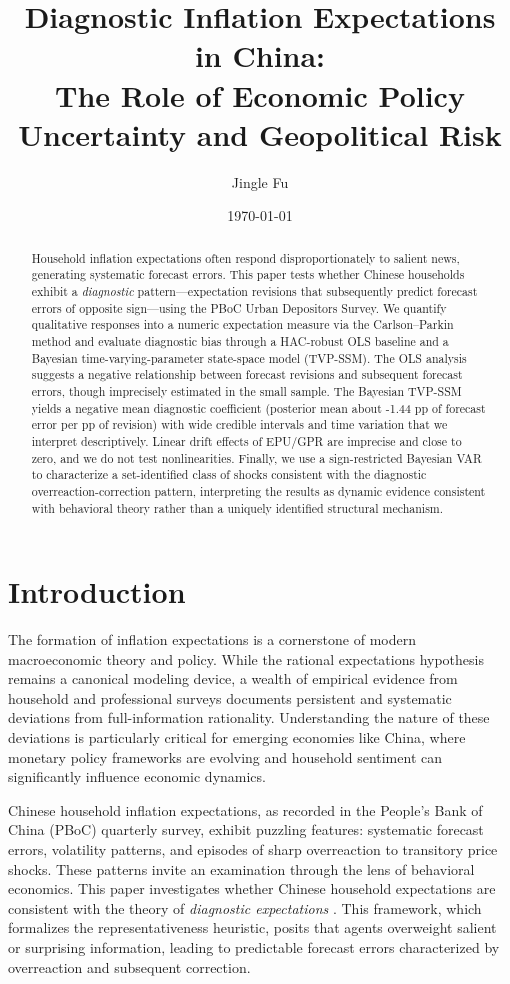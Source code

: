 \documentclass[12pt]{article}
\title{Diagnostic Inflation Expectations in China:\\ The Role of Economic Policy Uncertainty and Geopolitical Risk}
\author{Jingle Fu}
\date{\today}
\begin{document}
\maketitle

\begin{abstract}
    Household inflation expectations often respond disproportionately to salient news, generating systematic forecast errors. This paper tests whether Chinese households exhibit a \emph{diagnostic} pattern—expectation revisions that subsequently predict forecast errors of opposite sign—using the PBoC Urban Depositors Survey. We quantify qualitative responses into a numeric expectation measure via the Carlson–Parkin method and evaluate diagnostic bias through a HAC-robust OLS baseline and a Bayesian time-varying-parameter state-space model (TVP-SSM). The OLS analysis suggests a negative relationship between forecast revisions and subsequent forecast errors, though imprecisely estimated in the small sample. The Bayesian TVP-SSM yields a negative mean diagnostic coefficient (posterior mean about -1.44 pp of forecast error per pp of revision) with wide credible intervals and time variation that we interpret descriptively. Linear drift effects of EPU/GPR are imprecise and close to zero, and we do not test nonlinearities. Finally, we use a sign-restricted Bayesian VAR to characterize a set-identified class of shocks consistent with the diagnostic overreaction-correction pattern, interpreting the results as dynamic evidence consistent with behavioral theory rather than a uniquely identified structural mechanism.
\end{abstract}

\section{Introduction}
The formation of inflation expectations is a cornerstone of modern macroeconomic theory and policy. While the rational expectations hypothesis remains a canonical modeling device, a wealth of empirical evidence from household and professional surveys documents persistent and systematic deviations from full-information rationality. Understanding the nature of these deviations is particularly critical for emerging economies like China, where monetary policy frameworks are evolving and household sentiment can significantly influence economic dynamics.

Chinese household inflation expectations, as recorded in the People's Bank of China (PBoC) quarterly survey, exhibit puzzling features: systematic forecast errors, volatility patterns, and episodes of sharp overreaction to transitory price shocks. These patterns invite an examination through the lens of behavioral economics. This paper investigates whether Chinese household expectations are consistent with the theory of \emph{diagnostic expectations} \cite{Bordalo2018}. This framework, which formalizes the representativeness heuristic, posits that agents overweight salient or surprising information, leading to predictable forecast errors characterized by overreaction and subsequent correction.
\end{document}
